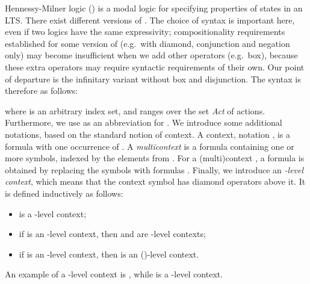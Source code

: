 \documentclass{eptcs}
\begin{document}
Hennessy-Milner logic () \cite{HeMi85} is a modal logic for specifying properties of states in an LTS.
There exist different versions of  \cite{HeMi85,Gla01,BlRiVe01}. The choice of syntax is important here,
even if two logics have the same expressivity; compositionality requirements established for some version of 
(e.g.\ with diamond, conjunction and negation only) may become insufficient when we add other operators
(e.g.\ box), because these extra operators may require syntactic requirements of their own.
Our point of departure is the infinitary  variant without box and disjunction. The  syntax is therefore as follows:
\begin{center}

\end{center}
where  is an arbitrary index set, and  ranges over the set {\it Act} of actions.
Furthermore, we use  as an abbreviation for . We introduce some additional notations, based on the standard notion of context. A context, notation , is a  formula with one occurrence of . A \textit{multicontext } is a  formula containing one or more  symbols, indexed by the elements from . For a (multi)context , a formula is obtained by replacing the  symbols with formulas .
Finally, we introduce an \textit{-level context}, which means that the context symbol has  diamond operators above it. It is defined inductively as follows:
 \begin{itemize}
 \item  is a -level context;
 \item if  is an -level context, then  and  are -level contexts;
 \item if  is an -level context, then  is an ()-level context.
 \end{itemize}
An example of a -level context is , while  is a -level context.
\end{document}
